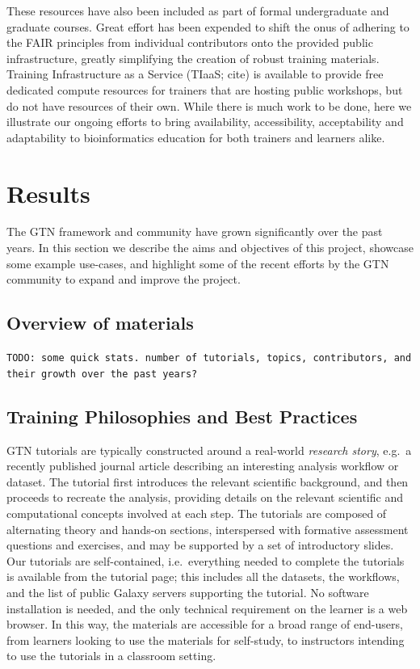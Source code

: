 \documentclass[10pt,letterpaper]{article}
\begin{document}
These resources have also been included as part of formal undergraduate and graduate courses. Great effort has been expended to shift the onus of adhering to the FAIR principles \cite{Wilkinson2016} from individual contributors onto the provided public infrastructure, greatly simplifying the creation of robust training materials.
Training Infrastructure as a Service (TIaaS; cite) is available to provide free dedicated compute resources for trainers that are hosting public workshops, but do not have resources of their own.
While there is much work to be done, here we illustrate our ongoing efforts to bring availability, accessibility, acceptability and adaptability to bioinformatics education for both trainers and learners alike.




\section*{Results}

The GTN framework and community have grown significantly over the past years. In this section we describe the aims and objectives of this project, showcase some example use-cases, and highlight some of the recent efforts by the GTN community to expand and improve the project.

\subsection*{Overview of materials}

\verb+TODO: some quick stats. number of tutorials, topics, contributors, and their growth over the past years?+



\subsection*{Training Philosophies and Best Practices}

GTN tutorials are typically constructed around a real-world \emph{research story}, e.g.\ a recently published journal article describing an interesting analysis workflow or dataset.
The tutorial first introduces the relevant scientific background, and then proceeds to recreate the analysis, providing details on the relevant scientific and computational concepts involved at each step.
The tutorials are composed of alternating theory and hands-on sections, interspersed with formative assessment questions and exercises, and may be supported by a set of introductory slides.
Our tutorials are self-contained, i.e.\ everything needed to complete the tutorials is available from the tutorial page; this includes all the datasets, the workflows, and the list of public Galaxy servers supporting the tutorial. No software installation is needed, and the only technical requirement on the learner is a web browser.
In this way, the materials are accessible for a broad range of end-users, from learners looking to use the materials for self-study, to instructors intending to use the tutorials in a classroom setting.
\end{document}
